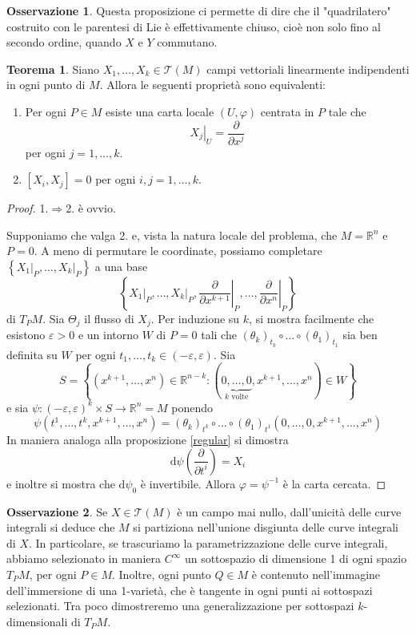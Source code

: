 \documentclass[a4paper,11pt]{article}
\theoremstyle{definition}
\newtheorem{osservazione}{Osservazione}[section]
\theoremstyle{theorem}
\newtheorem{teorema}{Teorema}[section]
\newcommand{\dif}{\mathrm{d}}
\newcommand{\R}{\mathbb{R}}
\begin{document}
\begin{osservazione}
	Questa proposizione ci permette di dire che il "quadrilatero" costruito con le parentesi di Lie è effettivamente chiuso, cioè non solo fino al secondo ordine, quando $X$ e $Y$ commutano.
\end{osservazione}
\begin{teorema}
	\label{regular2}
	Siano $X_1,\dots,X_k\in\mathcal{T}(M)$ campi vettoriali linearmente indipendenti in ogni punto di $M$. Allora le seguenti proprietà sono equivalenti:
	\begin{enumerate}
		\item Per ogni $P\in M$ esiste una carta locale $(U,\varphi)$ centrata in $P$ tale che 
		\[\left.X_j\right|_{U}=\frac{\partial}{\partial x^j}\]
		per ogni $j=1,\dots,k$.
		\item $[X_i,X_j]=0$ per ogni $i,j=1,\dots,k$.
	\end{enumerate}
\end{teorema}
\begin{proof}
	1.$\Rightarrow$2. è ovvio.
	
		Supponiamo che valga 2. e, vista la natura locale del problema, che $M=\R^n$ e $P=0$. A meno di permutare le coordinate, possiamo completare $\left\{\left.X_1\right|_{P},\dots,\left.X_k\right|_{P}\right\}$ a una base
		\[\left\{\left.X_1\right|_{P},\dots,\left.X_k\right|_{P},\left.\frac{\partial}{\partial x^{k+1}}\right|_{P},\dots,\left.\frac{\partial}{\partial x^{n}}\right|_{P}\right\}\]
		di $T_PM$. Sia $\Theta_j$ il flusso di $X_j$. Per induzione su $k$, si mostra facilmente che esistono $\varepsilon>0$ e un intorno $W$ di $P=0$ tali che $(\theta_k)_{t_k}\circ\dots\circ(\theta_1)_{t_1}$ sia ben definita su $W$ per ogni $t_1,\dots,t_k\in(-\varepsilon,\varepsilon)$. Sia
		\[S=\left\{(x^{k+1},\dots,x^n)\in\R^{n-k}:(\underbrace{0,\dots,0}_{k\textrm{ volte}},x^{k+1},\dots,x^n)\in W\right\}\]
		e sia $\psi\colon(-\varepsilon,\varepsilon)^k\times S\to\R^n=M$ ponendo
		\[\psi(t^1,\dots,t^k,x^{k+1},\dots,x^n)=(\theta_k)_{t^k}\circ\dots\circ(\theta_1)_{t^1}(0,\dots,0,x^{k+1},\dots,x^n)\]
		In maniera analoga alla proposizione \ref{regular} si dimostra
		\[\dif\psi\left(\frac{\partial}{\partial t^i}\right)=X_i\]
		e inoltre si mostra che $\dif\psi_0$ è invertibile. Allora $\varphi=\psi^{-1}$ è la carta cercata.
\end{proof}
\begin{osservazione}
	Se $X\in\mathcal{T}(M)$ è un campo mai nullo, dall'unicità delle curve integrali si deduce che $M$ si partiziona nell'unione disgiunta delle curve integrali di $X$. In particolare, se trascuriamo la parametrizzazione delle curve integrali, abbiamo selezionato in maniera $C^\infty$ un sottospazio di dimensione 1 di ogni spazio $T_PM$, per ogni $P\in M$. Inoltre, ogni punto $Q\in M$ è contenuto nell'immagine dell'immersione di una 1-varietà, che è tangente in ogni punti ai sottospazi selezionati. Tra poco dimostreremo una generalizzazione per sottospazi $k$-dimensionali di $T_PM$.
\end{osservazione}
\newpage
\end{document}
